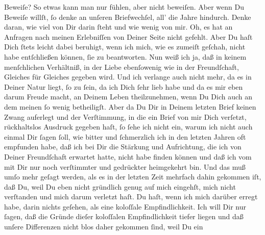 \begin{ledgroupsized}[t]{13cm}
               Beweiſe? So etwas kann man nur fühlen, aber nicht beweiſen. Aber wenn Du Beweiſe
               willſt, ſo denke an unſeren Briefwechſel, all’ die Jahre hindurch. Denke {\pb}daran, wie viel von Dir darin ſteht und wie wenig
               von mir. Oh, es hat an Anfragen nach meinen Erlebniſſen von Deiner Seite nicht
               gefehlt. Aber Du haſt Dich ſtets leicht dabei beruhigt, wenn ich mich, wie es zumeiſt
               geſchah, nicht habe entſchließen können, ſie zu beantworten. Nun weiß ich ja, daß in
               keinem menſchlichen Verhältniß, in der Liebe ebenſowenig wie in der Freundſchaft,
               Gleiches für Gleiches gegeben wird. Und ich verlange auch nicht mehr, da es in Deiner
               Natur liegt, ſo zu ſein, da ich Dich ſehr lieb habe und da es mir eben darum Freude
               macht, an Deinem Leben theilzunehmen, wenn Du Dich auch an dem meinen ſo wenig
               betheiligſt. Aber da Du Dir in Deinem letzten Brief keinen Zwang auferlegt und der
               Verſtimmung, in die ein Brief von mir Dich verſetzt, rückhaltslos Ausdruck gegeben
               haſt, ſo ſehe ich nicht ein, warum ich nicht auch einmal Dir ſagen ſoll, wie bitter
               und ſchmerzlich \strikeout{\textcolor{gray}{h}} ich in den letzten Jahren oft  empfunden
               habe, daß {\pb}ich bei Dir die Stärkung und Aufrichtung,
               die ich von Deiner Freundſchaft erwartet hatte, nicht habe finden können und daß ich
               vom \label{K_L03194-2v}\label{K_L03194-2h} mit Dir nur noch
               verſtimmter und gedrückter heimgekehrt bin. Und das muß umſo mehr geſagt werden, als
               es in der letzten Zeit mehrfach dahin gekommen iſt, daß Du, weil Du eben nicht
               gründlich genug auf mich eingehſt, mich \strikeout{\textcolor{gray}{×}\-\textcolor{gray}{×}} nicht verſtanden und mich darum verletzt haſt. Du haſt, wenn ich mich darüber
               erregt habe, darin nichts geſehen, als eine koloſſale Empfindlichkeit. Ich will Dir
               nur ſagen, daß die Gründe dieſer koloſſalen Empfindlichkeit tiefer liegen und daß
               unſere Differenzen nicht blos daher gekommen ſind, weil Du ein \label{K_L03194-11v}
\end{ledgroupsized}
